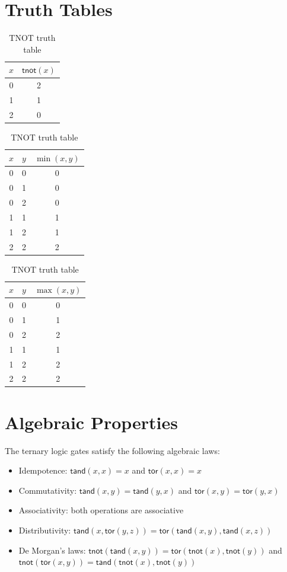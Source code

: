 \documentclass[12pt,a4paper,twoside]{book}
\theoremstyle{trinarytheorem}
\theoremstyle{trinarydefinition}
\newcommand{\code}[1]{\textsf{#1}}
\begin{document}
\section{Truth Tables}

\begin{table}[H]
\centering
\caption{TNOT truth table}
\label{tab:tnot}
\begin{tabular}{c|c}
$x$ & $\code{tnot}(x)$ \\ \midrule
0 & 2 \\
1 & 1 \\
2 & 0
\end{tabular}
\qquad
\begin{tabular}{cc|c}
$x$ & $y$ & $\min(x,y)$ \\ \midrule
0 & 0 & 0 \\
0 & 1 & 0 \\
0 & 2 & 0 \\
1 & 1 & 1 \\
1 & 2 & 1 \\
2 & 2 & 2
\end{tabular}
\qquad
\begin{tabular}{cc|c}
$x$ & $y$ & $\max(x,y)$ \\ \midrule
0 & 0 & 0 \\
0 & 1 & 1 \\
0 & 2 & 2 \\
1 & 1 & 1 \\
1 & 2 & 2 \\
2 & 2 & 2
\end{tabular}
\end{table}

\section{Algebraic Properties}

The ternary logic gates satisfy the following algebraic laws:
\begin{itemize}
    \item Idempotence: $\code{tand}(x, x) = x$ and $\code{tor}(x, x) = x$
    \item Commutativity: $\code{tand}(x, y) = \code{tand}(y, x)$ and
          $\code{tor}(x, y) = \code{tor}(y, x)$
    \item Associativity: both operations are associative
    \item Distributivity: $\code{tand}(x, \code{tor}(y, z)) =
          \code{tor}(\code{tand}(x, y), \code{tand}(x, z))$
    \item De Morgan's laws: $\code{tnot}(\code{tand}(x, y)) =
          \code{tor}(\code{tnot}(x), \code{tnot}(y))$ and
          $\code{tnot}(\code{tor}(x, y)) =
          \code{tand}(\code{tnot}(x), \code{tnot}(y))$
\end{itemize}
\end{document}
